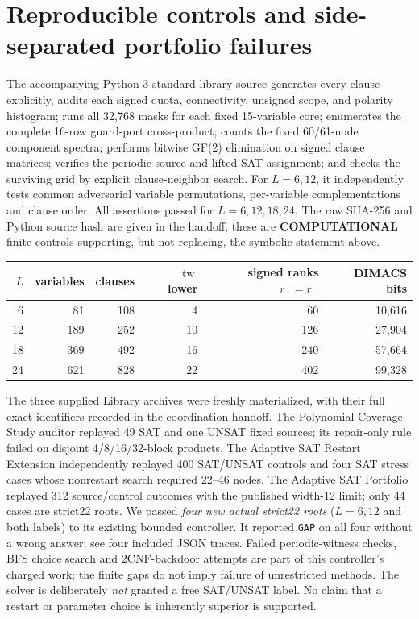 \documentclass[10pt]{article}
\begin{document}
\section{Reproducible controls and side-separated portfolio failures}
The accompanying Python 3 standard-library source generates every clause explicitly, audits each signed quota, connectivity, unsigned scope, and polarity histogram; runs all 32,768 masks for each fixed 15-variable core; enumerates the complete 16-row guard-port cross-product; counts the fixed 60/61-node component spectra; performs bitwise GF(2) elimination on signed clause matrices; verifies the periodic source and lifted SAT assignment; and checks the surviving grid by explicit clause-neighbor search. For $L=6,12$, it independently tests common adversarial variable permutations, per-variable complementations and clause order. All assertions passed for $L=6,12,18,24$. The raw SHA-256 and Python source hash are given in the handoff; these are \textbf{COMPUTATIONAL} finite controls supporting, but not replacing, the symbolic statement above.
\begin{center}\begin{tabular}{r|r|r|r|r|r}
\toprule
$L$ & variables & clauses & $\operatorname{tw}$ lower & signed ranks $r_+=r_-$ & DIMACS bits\\\midrule
6&81&108&4&60&10,616\\
12&189&252&10&126&27,904\\
18&369&492&16&240&57,664\\
24&621&828&22&402&99,328\\\bottomrule
\end{tabular}\end{center}
The three supplied Library archives were freshly materialized, with their full exact identifiers recorded in the coordination handoff. The Polynomial Coverage Study auditor replayed 49 SAT and one UNSAT fixed sources; its repair-only rule failed on disjoint 4/8/16/32-block products. The Adaptive SAT Restart Extension independently replayed 400 SAT/UNSAT controls and four SAT stress cases whose nonrestart search required 22--46 nodes. The Adaptive SAT Portfolio replayed 312 source/control outcomes with the published width-12 limit; only 44 cases are strict22 roots. We passed \emph{four new actual strict22 roots} ($L=6,12$ and both labels) to its existing bounded controller. It reported \texttt{GAP} on all four without a wrong answer; see four included JSON traces. Failed periodic-witness checks, BFS choice search and 2CNF-backdoor attempts are part of this controller's charged work; the finite gaps do not imply failure of unrestricted methods. The solver is deliberately \emph{not} granted a free SAT/UNSAT label. No claim that a restart or parameter choice is inherently superior is supported.
\end{document}
